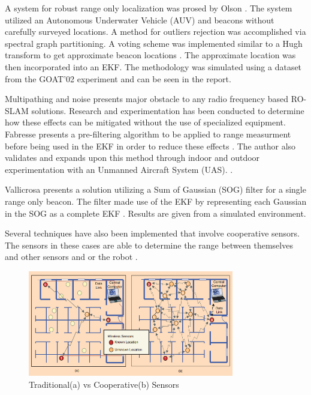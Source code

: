 \documentclass[conference]{IEEEtran}
\begin{document}
A system for robust range only localization was prosed by Olson \cite{Olson2006}. The system utilized an Autonomous Underwater Vehicle (AUV) and beacons without carefully surveyed locations. A method for outliers rejection was accomplished via spectral graph partitioning. A voting scheme was implemented similar to a Hugh transform to get approximate beacon locations \cite{Hough1959}. The approximate location was then incorporated into an EKF. The methodology was simulated using a dataset from the GOAT'02 experiment and can be seen in the report. %


Multipathing and noise presents major obstacle to any radio frequency based RO-SLAM solutions. Research and experimentation has been conducted to determine how these effects can be mitigated without the use of specialized equipment. Fabresse presents a pre-filtering algorithm to be applied to range measurment before being used in the EKF in order to reduce these effects \cite{Fabresse2014}. The author also validates and expands upon this method through indoor and outdoor experimentation with an Unmanned Aircraft System (UAS). \cite{Fabresse2016}. 



Vallicrosa presents a solution utilizing a Sum of Gaussian (SOG) filter for a single range only beacon. The filter made use of the EKF by representing each Gaussian in the SOG as a complete EKF \cite{Vallicrosa2015}. Results are given from a simulated environment.


Several techniques have also been implemented that involve cooperative sensors. The sensors in these cases are able to determine the range between themselves and other sensors and or the robot \cite{Patwari2005}.

\begin{figure}[h!]
	\centering
	\includegraphics[width=90mm]{coop_loc_comp_patwari.png}
	\caption{Traditional(a) vs Cooperative(b) Sensors \cite{Patwari2005}}
	\label{trad_vs_coop_sensors}
\end{figure}
\end{document}
